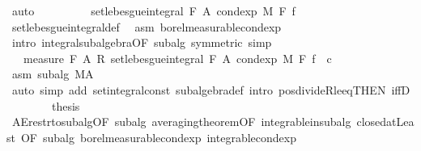 \begin{isabellebody}
\ auto\isanewline
\ \ \ \ \isamarkupfalse%
\ \isamarkupfalse%
\ {\isachardoublequoteopen}{\isachardot}{\kern0pt}{\isachardot}{\kern0pt}{\isachardot}{\kern0pt}\ {\isacharequal}{\kern0pt}\ set{\isacharunderscore}{\kern0pt}lebesgue{\isacharunderscore}{\kern0pt}integral\ {\isacharquery}{\kern0pt}F\ A\ {\isacharparenleft}{\kern0pt}cond{\isacharunderscore}{\kern0pt}exp\ M\ F\ f{\isacharparenright}{\kern0pt}{\isachardoublequoteclose}\ \isamarkupfalse%
\ set{\isacharunderscore}{\kern0pt}lebesgue{\isacharunderscore}{\kern0pt}integral{\isacharunderscore}{\kern0pt}def\ \isamarkupfalse%
\ asm\ borel{\isacharunderscore}{\kern0pt}measurable{\isacharunderscore}{\kern0pt}cond{\isacharunderscore}{\kern0pt}exp\ \isamarkupfalse%
\ {\isacharparenleft}{\kern0pt}intro\ integral{\isacharunderscore}{\kern0pt}subalgebra{}{\isacharbrackleft}{\kern0pt}OF\ subalg{\isacharcomma}{\kern0pt}\ symmetric{\isacharbrackright}{\kern0pt}{\isacharcomma}{\kern0pt}\ simp{\isacharparenright}{\kern0pt}\isanewline
\ \ \ \ \isamarkupfalse%
\ \isamarkupfalse%
\ {\isachardoublequoteopen}{\isacharparenleft}{\kern0pt}{}\ {\isacharslash}{\kern0pt}\ measure\ {\isacharquery}{\kern0pt}F\ A{\isacharparenright}{\kern0pt}\ {\isacharasterisk}{\kern0pt}\isactrlsub R\ set{\isacharunderscore}{\kern0pt}lebesgue{\isacharunderscore}{\kern0pt}integral\ {\isacharquery}{\kern0pt}F\ A\ {\isacharparenleft}{\kern0pt}cond{\isacharunderscore}{\kern0pt}exp\ M\ F\ f{\isacharparenright}{\kern0pt}\ {\isasymin}\ {\isacharbraceleft}{\kern0pt}c{\isachardot}{\kern0pt}{\isachardot}{\kern0pt}{\isacharbraceright}{\kern0pt}{\isachardoublequoteclose}\ \isamarkupfalse%
\ asm\ subalg\ M{\isacharunderscore}{\kern0pt}A\ \isamarkupfalse%
\ {\isacharparenleft}{\kern0pt}auto\ simp\ add{\isacharcolon}{\kern0pt}\ set{\isacharunderscore}{\kern0pt}integral{\isacharunderscore}{\kern0pt}const\ subalgebra{\isacharunderscore}{\kern0pt}def\ intro{\isacharbang}{\kern0pt}{\isacharcolon}{\kern0pt}\ pos{\isacharunderscore}{\kern0pt}divideR{\isacharunderscore}{\kern0pt}le{\isacharunderscore}{\kern0pt}eq{\isacharbrackleft}{\kern0pt}THEN\ iffD{}{\isacharbrackright}{\kern0pt}{\isacharparenright}{\kern0pt}\ \isanewline
\ \ \isacommand{{\isacharbraceright}{\kern0pt}}\isamarkupfalse%
\isanewline
\ \ \isamarkupfalse%
\ {\isacharquery}{\kern0pt}thesis\ \isamarkupfalse%
\ AE{\isacharunderscore}{\kern0pt}restr{\isacharunderscore}{\kern0pt}to{\isacharunderscore}{\kern0pt}subalg{\isacharbrackleft}{\kern0pt}OF\ subalg{\isacharbrackright}{\kern0pt}\ averaging{\isacharunderscore}{\kern0pt}theorem{\isacharbrackleft}{\kern0pt}OF\ integrable{\isacharunderscore}{\kern0pt}in{\isacharunderscore}{\kern0pt}subalg\ closed{\isacharunderscore}{\kern0pt}atLeast{\isacharcomma}{\kern0pt}\ OF\ subalg\ borel{\isacharunderscore}{\kern0pt}measurable{\isacharunderscore}{\kern0pt}cond{\isacharunderscore}{\kern0pt}exp\ integrable{\isacharunderscore}{\kern0pt}cond{\isacharunderscore}{\kern0pt}exp{\isacharbrackright}{\kern0pt}\ \isamarkupfalse%

\end{isabellebody}
